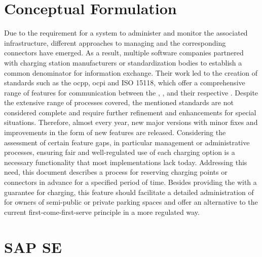 \section{Conceptual Formulation}
\label{ch:Introduction:sec:Conceptual Formulation}

Due to the requirement for a system to administer and monitor the associated infrastructure, different approaches to managing  and the corresponding connectors have emerged.
As a result, multiple software companies partnered with charging station manufacturers or standardization bodies to establish a common denominator for information exchange.
Their work led to the creation of standards such as the \acrfull{ocpp}, \acrfull{ocpi} and ISO 15118, which offer a comprehensive range of features for communication between the , , and their respective .
Despite the extensive range of processes covered, the mentioned standards are not considered complete and require further refinement and enhancements for special situations.
Therefore, almost every year, new major versions with minor fixes and improvements in the form of new features are released. 
Considering the assessment of certain feature gaps, in particular management or administrative processes, ensuring fair and well-regulated use of each charging option is a necessary functionality that most implementations lack today.
Addressing this need, this document describes a process for reserving charging points or connectors in advance for a specified period of time.
Besides providing the  with a guarantee for charging, this feature should facilitate a detailed administration of  for owners of semi-public or private parking spaces and offer an alternative to the current first-come-first-serve principle in a more regulated way.

\section{SAP SE}
\label{ch:Introduction:sec:SAP SE}

